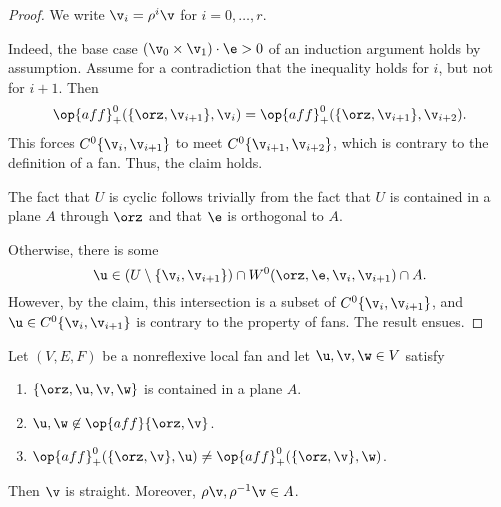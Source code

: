 \begin{proof} 
We write $\v_i = \rho^i \v$ for $i=0,\ldots,r$.

Indeed, the base case $(\v_0\times \v_1)\cdot \e > 0$ of an induction
argument holds by assumption.  Assume for a contradiction that the
inequality holds for $i$, but not for $i+1$.  Then
\[ 
  \op{aff}^0_+(\{\orz,\v_{i+1}\},\v_i) 
= \op{aff}^0_+(\{\orz,\v_{i+1}\},\v_{i+2}).
\]  
This forces $C^0\{\v_i,\v_{i+1}\}$ to meet $C^0\{\v_{i+1},\v_{i+2}\}$,
which is contrary to the definition of a fan.  Thus, the claim holds.

The fact that $U$ is cyclic follows trivially from the fact that $U$
is contained in a plane $A$ through $\orz$ and that $\e$ is orthogonal
to $A$.

Otherwise, there is some 
\[ 
  \u \in (U\setminus \{\v_i,\v_{i+1}\}) 
\cap W^0(\orz,\e,\v_i,\v_{i+1}) \cap A.
\] 
However, by the claim, this intersection is a subset of $C^0\{\v_i,\v_{i+1}\}$, and
$\u\in C^0\{\v_i,\v_{i+1}\}$ is contrary to the property
 of fans.  The result ensues.
\end{proof}

\begin{lemma}[] \label{lemma:A}  
Let $(V,E,F)$ be a nonreflexive local fan and let
  $\u,\v,\w\in V$ satisfy
\begin{enumerate}\wasitemize 
\item $\{\orz,\u,\v,\w\}$ is contained in a plane $A$. \vspace{3pt}
\item $\u,\w\not\in\op{aff}\{\orz,\v\}$. \vspace{3pt}
\item $\op{aff}^0_+(\{\orz,\v\},\u) \ne \op{aff}^0_+(\{\orz,\v\},\w)$.
\end{enumerate}\wasitemize 
Then $\v$ is straight.  Moreover, $\rho \v,\rho^{-1} \v\in A$.
\end{lemma}

